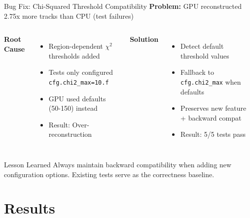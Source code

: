 \documentclass[aspectratio=169, table]{beamer}
\begin{document}
\begin{frame}{Bug Fix: Chi-Squared Threshold Compatibility}
\textbf{Problem:} GPU reconstructed 2.75x more tracks than CPU (test failures)

\vspace{0.5em}
\begin{columns}
\textbf{Root Cause}
\begin{itemize}
    \item Region-dependent $\chi^2$ thresholds added
    \item Tests only configured \texttt{cfg.chi2\_max=10.f}
    \item GPU used defaults (50-150) instead
    \item Result: Over-reconstruction
\end{itemize}

\textbf{Solution}
\begin{itemize}
    \item Detect default threshold values
    \item Fallback to \texttt{cfg.chi2\_max} when defaults
    \item Preserves new feature + backward compat
    \item Result: 5/5 tests pass
\end{itemize}
\end{columns}

\vspace{0.5em}
\begin{alertblock}{Lesson Learned}
    Always maintain backward compatibility when adding new configuration options. Existing tests serve as the correctness baseline.
\end{alertblock}
\end{frame}

\section{Results}
\end{document}
